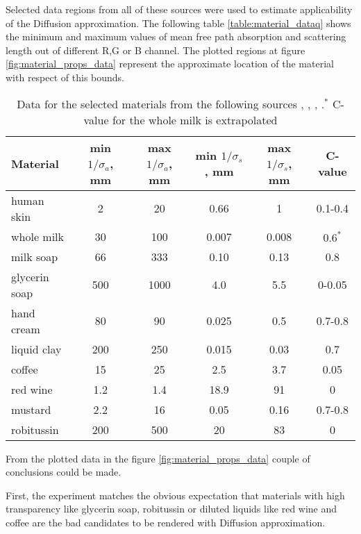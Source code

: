 Selected data regions from all of these sources were used to estimate applicability of the Diffusion
approximation. The following table \ref{table:material_dataq} shows the minimum and maximum values
of mean free path absorption and scattering length out of different R,G or B channel. The plotted
regions at figure \ref{fig:material_props_data} represent the approximate location of the material
with respect of this bounds.
\begin{table}[h]
\begin{tabu} to 0.6\textwidth { |l |c|c|c|c| c| }
    \hline
    Material & min $1/\sigma_a$, mm & max $1/\sigma_a$, mm & min $1/\sigma_s$, mm & max
    $1/\sigma_s$, mm & C-value \\ \hline
    \hline
    human skin & 2 & 20 & 0.66 & 1 & 0.1-0.4 \\ \hline
    whole milk & 30 & 100 & 0.007 & 0.008 & $0.6^*$ \\ \hline
    milk soap & 66 & 333 & 0.10 & 0.13 & 0.8 \\ \hline
    glycerin soap & 500 & 1000 & 4.0 & 5.5 & 0-0.05 \\ \hline
    hand cream & 80 & 90 & 0.025 & 0.5 & 0.7-0.8 \\ \hline
    liquid clay & 200 & 250 & 0.015 & 0.03 & 0.7 \\ \hline
    coffee & 15 & 25 & 2.5 & 3.7 & 0.05 \\ \hline
    red wine & 1.2 & 1.4 & 18.9 & 91 & 0 \\ \hline
    mustard & 2.2 & 16 & 0.05 & 0.16 & 0.7-0.8 \\ \hline
    robitussin & 200 & 500 & 20 & 83 & 0 \\ \hline
\end{tabu}
\caption{Data for the selected materials from the following sources
\cite{Jensen:2001:PMS:383259.383319}, \cite{tariq_efficient_2006-1},
\cite{Narasimhan:2006:ASP:1141911.1141986},
\cite{Gkioulekas:2013:IVR:2508363.2508377}.\newline $^*$ C-value for the whole milk is extrapolated}
\label{table:material_data}
\end{table}

From the plotted data in the figure \ref{fig:material_props_data} couple of conclusions could be
made.

First, the experiment matches the obvious expectation that materials with high transparency
like glycerin soap, robitussin or diluted liquids like red wine and coffee are the bad candidates to
be rendered with Diffusion approximation.

